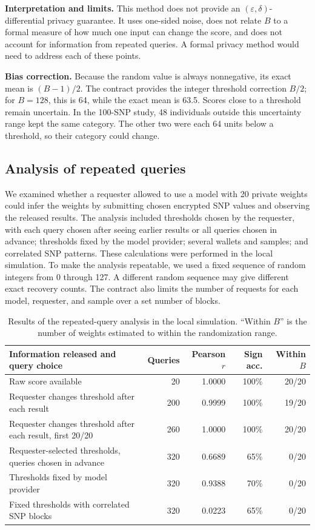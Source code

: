 \documentclass[10pt]{article}
\begin{document}
\textbf{Interpretation and limits.}
This method does not provide an $(\varepsilon,\delta)$-differential privacy guarantee.
It uses one-sided noise, does not relate $B$ to a formal measure of how much one input
can change the score, and does not account for information from repeated queries.  A
formal privacy method would need to address each of these points.

\textbf{Bias correction.}
Because the random value is always nonnegative, its exact mean is $(B-1)/2$.  The
contract provides the integer threshold correction $B/2$; for $B=128$, this is 64,
while the exact mean is 63.5.  Scores close to a threshold remain uncertain.  In the
100-SNP study, 48 individuals outside this uncertainty range kept the same category.
The other two were each 64 units below a threshold, so their category could change.

\subsection{Analysis of repeated queries}

We examined whether a requester allowed to use a model with 20 private weights could
infer the weights by submitting chosen encrypted SNP values and observing the released
results.  The analysis included thresholds chosen by the requester, with each query
chosen after seeing earlier results or all queries chosen in advance; thresholds fixed
by the model provider; several wallets and samples; and correlated SNP patterns.  These
calculations were performed in the local simulation.  To make the analysis repeatable,
we used a fixed sequence of random integers from 0 through 127. A different
random sequence may give different exact recovery counts. The contract also limits the
number of requests for each model, requester, and sample over a set number of blocks.

\begin{table}[t]
\centering
\caption{Results of the repeated-query analysis in the local simulation. ``Within
$B$'' is the number of weights estimated to within the randomization range.}
\label{tab:probing}
\small
\begin{tabularx}{\textwidth}{@{}Xrrrr@{}}
\toprule
\textbf{Information released and query choice} & \textbf{Queries} & \textbf{Pearson $r$} & \textbf{Sign acc.} & \textbf{Within $B$} \\
\midrule
Raw score available & 20 & 1.0000 & 100\% & 20/20 \\
Requester changes threshold after each result & 200 & 0.9999 & 100\% & 19/20 \\
Requester changes threshold after each result, first 20/20 & 260 & 1.0000 & 100\% & 20/20 \\
Requester-selected thresholds, queries chosen in advance & 320 & 0.6689 & 65\% & 0/20 \\
Thresholds fixed by model provider & 320 & 0.9388 & 70\% & 0/20 \\
Fixed thresholds with correlated SNP blocks & 320 & 0.0223 & 65\% & 0/20 \\
\bottomrule
\end{tabularx}
\end{table}
\end{document}
